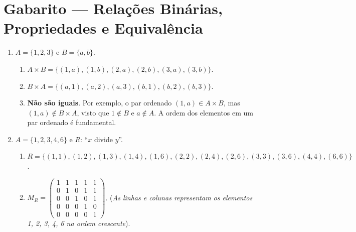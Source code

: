 \documentclass[12pt]{article}
\begin{document}
\vspace*{0.2cm}
\section*{Gabarito — Relações Binárias, Propriedades e Equivalência}

\begin{enumerate}

\item $A = \{1, 2, 3\}$ e $B = \{a, b\}$.
\begin{enumerate}[label=\alph*)]
    \item $A \times B = \{(1, a), (1, b), (2, a), (2, b), (3, a), (3, b)\}$.
    \item $B \times A = \{(a, 1), (a, 2), (a, 3), (b, 1), (b, 2), (b, 3)\}$.
    \item \textbf{Não são iguais}. Por exemplo, o par ordenado $(1, a) \in A \times B$, mas $(1, a) \notin B \times A$, visto que $1 \notin B$ e $a \notin A$. A ordem dos elementos em um par ordenado é fundamental.
\end{enumerate}

\item $A = \{1, 2, 3, 4, 6\}$ e $R$: ``$x$ divide $y$''.
\begin{enumerate}[label=\alph*)]
    \item $R = \{(1,1), (1,2), (1,3), (1,4), (1,6), (2,2), (2,4), (2,6), (3,3), (3,6), (4,4), (6,6)\}$.
    \item $M_R = \begin{pmatrix}
    1 & 1 & 1 & 1 & 1 \\
    0 & 1 & 0 & 1 & 1 \\
    0 & 0 & 1 & 0 & 1 \\
    0 & 0 & 0 & 1 & 0 \\
    0 & 0 & 0 & 0 & 1
    \end{pmatrix}$. \quad (\textit{As linhas e colunas representam os elementos 1, 2, 3, 4, 6 na ordem crescente}).
\end{enumerate}


\end{enumerate}
\end{document}
